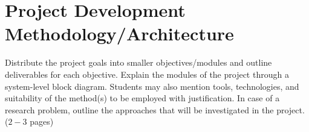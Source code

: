 
\chapter{Project Development Methodology/Architecture}
\label{Chapter5}

Distribute the project goals into smaller objectives/modules and outline deliverables for each objective. Explain the modules of the project through a system-level block diagram. Students may also mention tools, technologies, and suitability of the method(s) to be employed with justification. In case of a research problem, outline the approaches that will be investigated in the project. ($2-3$ pages)